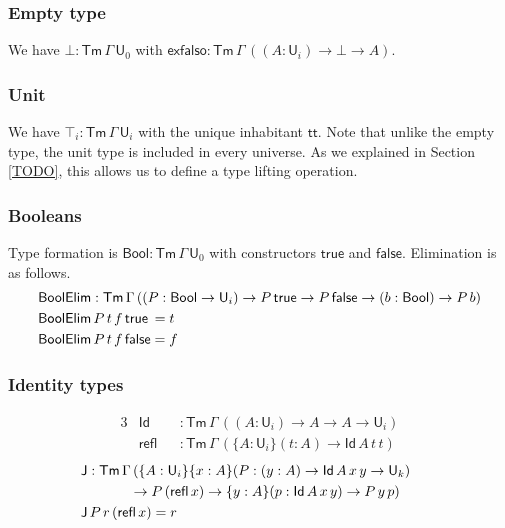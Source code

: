 \documentclass[acmsmall,screen,review,anonymous]{acmart}
\newcommand{\msf}[1]{{\mathsf{#1}}}
\newcommand{\U}{\msf{U}}
\newcommand{\ttt}{\msf{tt}}
\newcommand{\Bool}{\msf{Bool}}
\newcommand{\Tm}{\msf{Tm}}
\newcommand{\exfalso}{\msf{exfalso}}
\newcommand{\true}{\msf{true}}
\newcommand{\false}{\msf{false}}
\newcommand{\BoolElim}{\msf{BoolElim}}
\newcommand{\Id}{\msf{Id}}
\newcommand{\refl}{\msf{refl}}
\newcommand{\J}{\msf{J}}
\begin{document}
\subsubsection{Empty type}
We have $\bot : \Tm\,\Gamma\,\U_0$ with $\exfalso : \Tm\,\Gamma\,((A : \U_i) \to \bot
\to A)$.

\subsubsection{Unit} We have $\top_i : \Tm\,\Gamma\,\U_i$ with the unique inhabitant $\ttt$. Note that unlike the empty type, the unit
type is included in every universe. As we explained in Section \ref{TODO}, this allows us to define
a type lifting operation.

\subsubsection{Booleans} Type formation is $\Bool : \Tm\,\Gamma\,\U_0$ with constructors $\true$ and $\false$. Elimination is as follows.
\begin{alignat*}{3}
  &\BoolElim : \Tm\,\Gamma\,((P : \Bool \to \U_i) \to P\,\true \to P\,\false \to (b : \Bool) \to P\,b)\\
  & \BoolElim\,P\,t\,f\,\true\hspace{0.2em} = t\\
  & \BoolElim\,P\,t\,f\,\false = f
\end{alignat*}


\subsubsection{Identity types}
\begin{alignat*}{3}
  &\Id   &&: \Tm\,\Gamma\,((A : \U_i) \to A \to A \to \U_i)\\
  &\refl &&: \Tm\,\Gamma\,(\{A : \U_i\}(t : A) \to \Id\,A\,t\,t)
\end{alignat*}
\begin{alignat*}{3}
  &\J : \Tm\,\Gamma\,(\{A : \U_i\}\{x : A\}(P : (y : A) \to \Id\,A\,x\,y \to \U_k)\\
  & \hspace{3.5em}\to P\,(\refl\,x) \to \{y : A\}(p : \Id\,A\,x\,y) \to P\,y\,p)&&
  &\\
  &\J\,P\,r\,(\refl\,x) = r
\end{alignat*}
\end{document}

